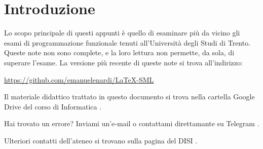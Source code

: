 \section*{Introduzione}

Lo scopo principale di questi appunti è quello di esaminare più da vicino gli esami di programmazione funzionale tenuti all'Università degli Studi di Trento. Queste note non sono complete, e la loro lettura non permette, da sola, di superare l’esame. La versione più recente di queste note si trova all'indirizzo:

\begin{center}
	\url{https://github.com/emanuelenardi/LaTeX-SML}
\end{center}

Il materiale didattico trattato in questo documento si trova nella cartella Google Drive del corso di Informatica %
\href{https://bit.ly/drive-folder}{\ExternalLink}.

\medskip
Hai trovato un errore? Inviami un'e-mail \href{mailto:emanuele.nardi@studenti.unitn.it}{\ExternalLink} o contattami direttamante su Telegram \href{https://t.me/emanuelenardi}{\ExternalLink}.

\medskip
Ulteriori contatti dell'ateneo si trovano sulla pagina del DISI %
\href{http://offertaformativa.unitn.it/it/l/informatica/contatti-e-referenti}{\ExternalLink}.

\tableofcontents					%
\lstlistoflistings					%
%
